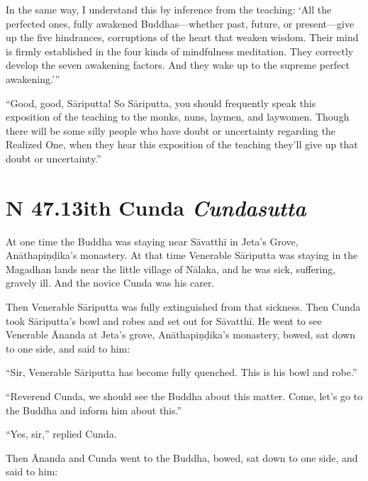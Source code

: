 \documentclass[12pt,openany]{book}%
\newcommand*{\suttatitleacronym}[1]{\smaller[2]{#1}\vspace*{.3em}}
\newcommand*{\suttatitletranslation}[1]{\linebreak{#1}}
\newcommand*{\suttatitleroot}[1]{\linebreak\smaller[2]\itshape{#1}}
\newcommand*{\tocacronym}[1]{\hspace*{-3.3em}{#1}\quad}
\newcommand*{\toctranslation}[1]{#1}
\newcommand*{\tocroot}[1]{(\textit{#1})}
\begin{document}
In the same way, I understand this by inference from the teaching: ‘All the perfected ones, fully awakened Buddhas—whether past, future, or present—give up the five hindrances, corruptions of the heart that weaken wisdom. Their mind is firmly established in the four kinds of mindfulness meditation. They correctly develop the seven awakening factors. And they wake up to the supreme perfect awakening.’” 

“Good, good, \textsanskrit{Sāriputta}! So \textsanskrit{Sāriputta}, you should frequently speak this exposition of the teaching to the monks, nuns, laymen, and laywomen. Though there will be some silly people who have doubt or uncertainty regarding the Realized One, when they hear this exposition of the teaching they’ll give up that doubt or uncertainty.” 

%
\section*{{\suttatitleacronym SN 47.13}{\suttatitletranslation With Cunda }{\suttatitleroot Cundasutta}}
\addcontentsline{toc}{section}{\tocacronym{SN 47.13} \toctranslation{With Cunda } \tocroot{Cundasutta}}

At one time the Buddha was staying near \textsanskrit{Sāvatthī} in Jeta’s Grove, \textsanskrit{Anāthapiṇḍika}’s monastery. At that time Venerable \textsanskrit{Sāriputta} was staying in the Magadhan lands near the little village of \textsanskrit{Nālaka}, and he was sick, suffering, gravely ill. And the novice Cunda was his carer. 

Then Venerable \textsanskrit{Sāriputta} was fully extinguished from that sickness. Then Cunda took \textsanskrit{Sāriputta}’s bowl and robes and set out for \textsanskrit{Sāvatthī}. He went to see Venerable Ānanda at Jeta’s grove, \textsanskrit{Anāthapiṇḍika}’s monastery, bowed, sat down to one side, and said to him: 

“Sir, Venerable \textsanskrit{Sāriputta} has become fully quenched. This is his bowl and robe.” 

“Reverend Cunda, we should see the Buddha about this matter. Come, let’s go to the Buddha and inform him about this.” 

“Yes, sir,” replied Cunda. 

Then Ānanda and Cunda went to the Buddha, bowed, sat down to one side, and said to him: 
\end{document}
